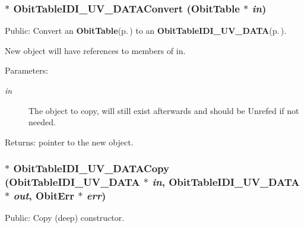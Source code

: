 \subsubsection{$\ast$ Obit\-Table\-IDI\_\-UV\_\-DATAConvert ({\bf Obit\-Table} $\ast$ {\em in})}\label{ObitTableIDI__UV__DATA_8c_a19}


Public: Convert an {\bf Obit\-Table}{\rm (p.\,\pageref{structObitTable})} to an {\bf Obit\-Table\-IDI\_\-UV\_\-DATA}{\rm (p.\,\pageref{structObitTableIDI__UV__DATA})}. 

New object will have references to members of in. \begin{Desc}
\item[Parameters:]
\begin{description}
\item[{\em in}]The object to copy, will still exist afterwards and should be Unrefed if not needed. \end{description}
\end{Desc}
\begin{Desc}
\item[Returns:]pointer to the new object. \end{Desc}
\subsubsection{$\ast$ Obit\-Table\-IDI\_\-UV\_\-DATACopy ({\bf Obit\-Table\-IDI\_\-UV\_\-DATA} $\ast$ {\em in}, {\bf Obit\-Table\-IDI\_\-UV\_\-DATA} $\ast$ {\em out}, {\bf Obit\-Err} $\ast$ {\em err})}\label{ObitTableIDI__UV__DATA_8c_a20}


Public: Copy (deep) constructor. 

